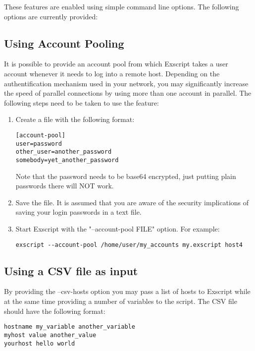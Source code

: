 These features are enabled using simple command line options. The following 
options are currently provided:




\subsection{Using Account Pooling}

It is possible to provide an account pool from which Exscript takes a 
user account whenever it needs to log into a remote host. Depending on 
the authentification mechanism used in your network, you may significantly 
increase the speed of parallel connections by using more than one account 
in parallel. The following steps need to be taken to use the feature:

\begin{enumerate}
\item Create a file with the following format:

\begin{lstlisting}
[account-pool]
user=password
other_user=another_password
somebody=yet_another_password
\end{lstlisting}

Note that the password needs to be base64 encrypted, just putting plain
passwords there will NOT work.

\item Save the file. It is assumed that you are aware of the security 
implications of saving your login passwords in a text file.
\item Start Exscript with the "--account-pool FILE" option. For example:

\begin{lstlisting}
exscript --account-pool /home/user/my_accounts my.exscript host4
\end{lstlisting}
\end{enumerate}


\subsection{Using a CSV file as input}

By providing the --csv-hosts option you may pass a list of hosts to 
Exscript while at the same time providing a number of variables to 
the script. The CSV file should have the following format: 

\begin{lstlisting}
hostname my_variable another_variable
myhost value another_value
yourhost hello world
\end{lstlisting}

